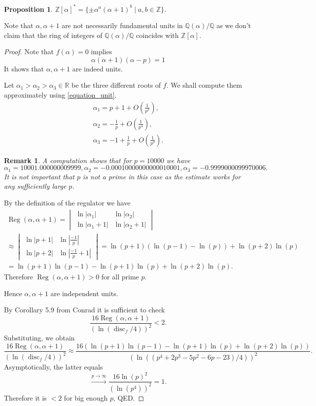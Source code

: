 \documentclass[a4paper]{article}
\newtheorem{Prop}[Thm]{Proposition}
\newtheorem{Rem}[Thm]{Remark}
\newcommand{\R}{\mathbb{R}}        %
\newcommand{\Q}{\mathbb{Q}}        %
\DeclareMathOperator{\Reg}{Reg}        %
\DeclareMathOperator{\disc}{disc}        %
\begin{document}
\begin{Prop}
	\label{prop_multiplicative_group_structure}
$\mathbb{Z}[\alpha]^{*} = \{ \pm \alpha^a (\alpha + 1)^b \mid a, b \in \mathbb{Z} \} $.
\end{Prop}
Note that $\alpha, \alpha + 1$ are not necessarily fundamental units in $\Q(\alpha)/\Q$ as we don't claim that the ring of integers of $\Q(\alpha) / \Q$ coincides with $\mathbb{Z}[\alpha]$.
\begin{proof}
Note that $f(\alpha) = 0$ implies 
\begin{equation}
\label{equation_unit}
\alpha (\alpha + 1) (\alpha - p) = 1
\end{equation}
It shows that $\alpha, \alpha + 1$ are indeed units.

Let $\alpha_1 > \alpha_2 > \alpha_3 \in \R$ be the three different roots of $f$.
We shall compute them approximately using \eqref{equation_unit}.
\begin{gather*}
\alpha_1 = p + 1 + O\left(\frac{1}{p^3}\right), \\
\alpha_2 = - \frac{1}{ p } + O\left(\frac{1}{p^4}\right), \\
\alpha_3 = - 1 + \frac{1}{ p } + O\left(\frac{1}{p^3}\right)
.\end{gather*}
\begin{Rem}
A computation shows that for $p = 10000$
we have
 \[
\alpha_1 = 10001.000000009999 ,
\alpha_2 = -0.00010000000000010001 ,
\alpha_3 = -0.9999000099970006 
.\] 
It is not important that $p$ is not a prime in this case as the estimate works for any sufficiently large $p$.
\end{Rem}

By the definition of the regulator we have
\begin{multline}
\Reg(\alpha, \alpha + 1) = 
\begin{vmatrix}
\ln |\alpha_1| 		& \ln |\alpha_2| \\
\ln |\alpha_1 + 1| 	& \ln |\alpha_2 + 1|
\end{vmatrix} 
\\
\approx
\begin{vmatrix}
\ln |p + 1| 	& \ln |\frac{-1}{p}| \\
\ln |p + 2| 	& \ln |\frac{-1}{p} + 1|
\end{vmatrix}
=
\ln(p + 1)
(\ln(p - 1) - \ln(p))
+
\ln(p + 2) \ln(p)
\\
=
\ln(p + 1) \ln(p - 1) - \ln(p + 1) \ln(p) + \ln(p + 2) \ln(p)
.\end{multline}
Therefore $ \Reg(\alpha, \alpha + 1) > 0 $ for all prime $p$.

Hence $\alpha, \alpha + 1$ are independent units. 

By Corollary 5.9 from Conrad it is sufficient to check
\[
\frac{16 \Reg(\alpha, \alpha + 1) }
{(\ln(\disc_f/4))^2} 
< 2
.\] 
Substituting, we obtain
\[
\frac{16 \Reg(\alpha, \alpha + 1) }
{(\ln(\disc_f/4))^2} 
\approx
\frac{16 
\left(\ln(p + 1) \ln(p - 1) - \ln(p + 1) \ln(p) + \ln(p + 2) \ln(p)\right)
}
{(\ln(
(p^4 + 2 p^3 - 5 p^2 - 6 p - 23)
/4))^2} 
.\] 
Asymptotically, the latter equals
\[
\stackrel{p \to \infty}{\longrightarrow}
\frac{16 
\ln(p)^2
}
{(\ln(
p^4 ))^2} = 1
.\] 
Therefore it is $< 2$ for big enough $p$, QED.
\end{proof}
\end{document}
